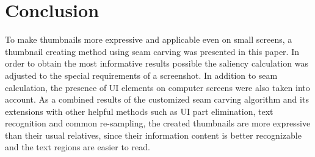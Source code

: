 \documentclass[draft,final]{vutinfth} %
\begin{document}
	\chapter{Conclusion}
	To make thumbnails more expressive and applicable even on small screens, a thumbnail creating method using seam carving was presented in this paper.
	In order to obtain the most informative results possible the saliency calculation was adjusted to the special requirements of a screenshot.
	In addition to seam calculation, the presence of UI elements on computer screens were also taken into account.
	As a combined results of the customized seam carving algorithm and its extensions with other helpful methods such as UI part elimination, text recognition and common re-sampling, the created thumbnails are more expressive than their usual relatives, since their information content is better recognizable and the text regions are easier to read.  
	
	
	\backmatter
	
	
	
	
	
	
	
	
	
\end{document}
